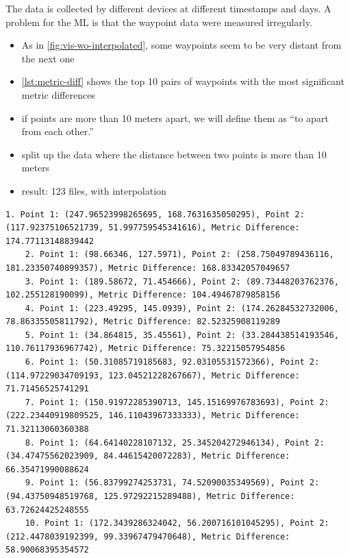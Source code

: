 The data is collected by different devices at different timestamps and days.
A problem for the ML is that the waypoint data were measured irregularly.
\begin{itemize}
    \item As in \cref{fig:vis-wo-interpolated}, some waypoints seem to be very distant from the next one
    \item \cref{lst:metric-diff} shows the top 10 pairs of waypoints with the most significant metric differences
    \item if points are more than 10 meters apart, we will define them as ``to apart from each other.''
    \item split up the data where the distance between two points is more than 10 meters
    \item result: 123 files, with interpolation
\end{itemize}

\begin{lstlisting}[caption={Top 10 pairs with the most significant metric differences},label={lst:metric-diff},captionpos=b]
    1. Point 1: (247.96523998265695, 168.7631635050295), Point 2: (117.92375106521739, 51.997759545341616), Metric Difference: 174.77113148839442
    2. Point 1: (98.66346, 127.5971), Point 2: (258.75049789436116, 181.23350740899357), Metric Difference: 168.83342057049657
    3. Point 1: (189.58672, 71.454666), Point 2: (89.73448203762376, 102.255128190099), Metric Difference: 104.49467879858156
    4. Point 1: (223.49295, 145.0939), Point 2: (174.26284532732006, 78.86335505811792), Metric Difference: 82.52325908119289
    5. Point 1: (34.864815, 35.45561), Point 2: (33.284438514193546, 110.76117936967742), Metric Difference: 75.32215057954856
    6. Point 1: (50.31085719185683, 92.03105531572366), Point 2: (114.97229034709193, 123.04521228267667), Metric Difference: 71.71456525741291
    7. Point 1: (150.91972285390713, 145.15169976783693), Point 2: (222.23440919809525, 146.11043967333333), Metric Difference: 71.32113060360388
    8. Point 1: (64.64140228107132, 25.345204272946134), Point 2: (34.47475562023909, 84.44615420072283), Metric Difference: 66.35471990088624
    9. Point 1: (56.83799274253731, 74.52090035349569), Point 2: (94.43750948519768, 125.97292215289488), Metric Difference: 63.72624425248555
    10. Point 1: (172.3439286324042, 56.200716101045295), Point 2: (212.4478039192399, 99.33967479470648), Metric Difference: 58.90068395354572
\end{lstlisting}

